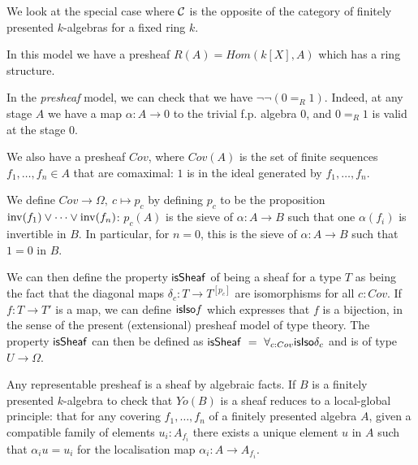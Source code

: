 \medskip

We look at the special case where $\mathcal{C}$ is the opposite of the category of finitely presented $k$-algebras for a fixed
ring $k$.

    In this model we have a presheaf $R(A) = Hom(k[X],A)$ which has a ring structure.

    In the {\em presheaf} model, we can check that we have $\neg\neg (0=_R 1)$. Indeed, at any stage $A$ we have
    a map $\alpha:A\rightarrow 0$ to the trivial f.p. algebra $0$, and $0 =_R 1$ is valid at the stage $0$.

    \medskip

    
    We also have a presheaf $Cov$, where $Cov(A)$ is the set of finite sequences $f_1,\dots,f_n\in A$ that are comaximal: $1$ is in the
    ideal generated by $f_1,\dots,f_n$.

    We define $Cov\rightarrow\Omega,~c\mapsto p_c$ by defining $p_c$ to be the proposition $\mathrm{inv}(f_1)\vee\dots\vee\mathrm{inv}(f_n)$: $p_c(A)$
    is the sieve of $\alpha:A\rightarrow B$ such that one $\alpha(f_i)$ is invertible in $B$.
    In particular, for $n=0$, this is the  sieve of $\alpha:A\rightarrow B$ such that $1=0$ in $B$.

    We can then define the property $\mathsf{isSheaf}$ of being a sheaf for a type $T$ as being the fact that
    the diagonal maps $\delta_c : T\rightarrow T^{[p_c]}$ are isomorphisms for all $c:Cov$.
    If $f:T\rightarrow T'$ is a map, we can define $\mathsf{isIso} f$ which expresses that $f$ is a bijection,
    in the sense of the present (extensional) presheaf model of type theory.
    The property $\mathsf{isSheaf}$ can then be defined as $\mathsf{isSheaf}~=~\forall_{c:Cov}\mathsf{isIso}\delta_c$ and is of type
    $U\rightarrow\Omega$.

    \medskip

    Any representable presheaf is a sheaf by algebraic facts. If $B$ is a finitely presented $k$-algebra
    to check that $Yo(B)$ is a sheaf reduces to a local-global principle: that for any covering $f_1,\dots,f_n$ of a finitely presented
    algebra $A$, given a compatible family of elements $u_i:A_{f_i}$ there exists a unique element $u$ in $A$ such that $\alpha_i u = u_i$
    for the localisation map $\alpha_i:A\rightarrow A_{f_i}$.

